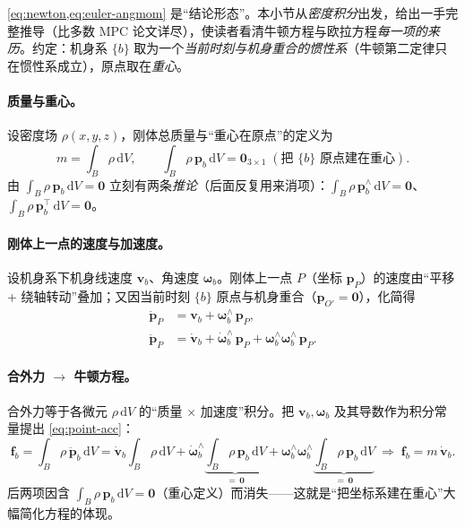 \cref{eq:newton,eq:euler-angmom} 是“结论形态”。本小节从\emph{密度积分}出发，给出一手完整推导（比多数 MPC 论文详尽），使读者看清牛顿方程与欧拉方程\emph{每一项的来历}\cite{unitree2023quadruped}。约定：机身系 $\{b\}$ 取为一个\emph{当前时刻与机身重合的惯性系}（牛顿第二定律只在惯性系成立），原点取在\emph{重心}。

\paragraph{质量与重心。}
设密度场 $\rho(x,y,z)$，刚体总质量与“重心在原点”的定义为
\begin{equation}
  m=\int_B\rho\,\mathrm{d}V,
  \qquad
  \int_B\rho\,\boldsymbol{p}_b\,\mathrm{d}V=\mathbf{0}_{3\times1}
  \;(\text{把 } \{b\}\text{ 原点建在重心}).
  \label{eq:mass-com}
\end{equation}
由 $\int_B\rho\,\boldsymbol{p}_b\,\mathrm{d}V=\mathbf{0}$ 立刻有两条\emph{推论}（后面反复用来消项）：$\int_B\rho\,\boldsymbol{p}_b^\wedge\,\mathrm{d}V=\mathbf{0}$、$\int_B\rho\,\boldsymbol{p}_b^\top\,\mathrm{d}V=\mathbf{0}$。

\paragraph{刚体上一点的速度与加速度。}
设机身系下机身线速度 $\boldsymbol{v}_b$、角速度 $\boldsymbol{\omega}_b$。刚体上一点 $P$（坐标 $\boldsymbol{p}_P$）的速度由“平移 + 绕轴转动”叠加；又因当前时刻 $\{b\}$ 原点与机身重合（$\boldsymbol{p}_{O'}=\mathbf{0}$），化简得
\begin{align}
  \dot{\boldsymbol{p}}_P&=\boldsymbol{v}_b+\boldsymbol{\omega}_b^\wedge\,\boldsymbol{p}_P,\label{eq:point-vel}\\
  \ddot{\boldsymbol{p}}_P&=\dot{\boldsymbol{v}}_b+\dot{\boldsymbol{\omega}}_b^\wedge\,\boldsymbol{p}_P+\boldsymbol{\omega}_b^\wedge\boldsymbol{\omega}_b^\wedge\,\boldsymbol{p}_P.\label{eq:point-acc}
\end{align}

\paragraph{合外力 $\to$ 牛顿方程。}
合外力等于各微元 $\rho\,\mathrm{d}V$ 的“质量 $\times$ 加速度”积分。把 $\boldsymbol{v}_b,\boldsymbol{\omega}_b$ 及其导数作为积分常量提出 \cref{eq:point-acc}：
\begin{equation}
  \boldsymbol{f}_b=\int_B\rho\,\ddot{\boldsymbol{p}}_b\,\mathrm{d}V
  =\dot{\boldsymbol{v}}_b\!\int_B\!\rho\,\mathrm{d}V
  +\dot{\boldsymbol{\omega}}_b^\wedge\!\underbrace{\int_B\!\rho\,\boldsymbol{p}_b\,\mathrm{d}V}_{=\,\mathbf{0}}
  +\boldsymbol{\omega}_b^\wedge\boldsymbol{\omega}_b^\wedge\!\underbrace{\int_B\!\rho\,\boldsymbol{p}_b\,\mathrm{d}V}_{=\,\mathbf{0}}
  \;\Longrightarrow\;
  \boxed{\boldsymbol{f}_b=m\,\dot{\boldsymbol{v}}_b}.
  \label{eq:newton-derived}
\end{equation}
后两项因含 $\int_B\rho\,\boldsymbol{p}_b\,\mathrm{d}V=\mathbf{0}$（重心定义）而消失——这就是“把坐标系建在重心”大幅简化方程的体现\cite{dicarlo2018cheetah}。

